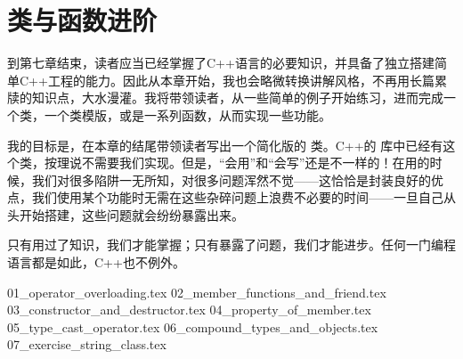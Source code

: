 \chapter{类与函数进阶}
到第七章结束，读者应当已经掌握了C++语言的必要知识，并具备了独立搭建简单C++工程的能力。因此从本章开始，我也会略微转换讲解风格，不再用长篇累牍的知识点，大水漫灌。我将带领读者，从一些简单的例子开始练习，进而完成一个类，一个类模版，或是一系列函数，从而实现一些功能。\par
我的目标是，在本章的结尾带领读者写出一个简化版的 \lstinline@string@ 类。C++的 \lstinline@string@ 库中已经有这个类，按理说不需要我们实现。但是，``会用''和``会写''还是不一样的！在用的时候，我们对很多陷阱一无所知，对很多问题浑然不觉——这恰恰是封装良好的优点，我们使用某个功能时无需在这些杂碎问题上浪费不必要的时间——一旦自己从头开始搭建，这些问题就会纷纷暴露出来。\par
只有用过了知识，我们才能掌握；只有暴露了问题，我们才能进步。任何一门编程语言都是如此，C++也不例外。\par
{01_operator_overloading.tex}
{02_member_functions_and_friend.tex}
{03_constructor_and_destructor.tex}
{04_property_of_member.tex}
{05_type_cast_operator.tex}
{06_compound_types_and_objects.tex}
{07_exercise_string_class.tex}
